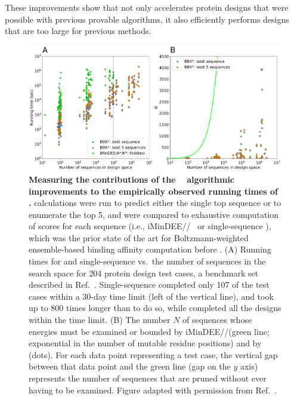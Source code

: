 These improvements show that \bbks not only accelerates protein designs that were possible with previous provable algorithms, it also efficiently performs designs that are too large for previous methods.

\begin{figure}
\center
\includegraphics[width=6.5in]{figures/bbks.png}
\caption{\textbf{Measuring the contributions of the \bbks~\cite{BBK*} algorithmic improvements to the empirically observed running times of \osprey.}  \bbks calculations were run to predict either the single top sequence or to enumerate the top 5, and were compared to exhaustive computation of \ks scores for each sequence (i.e., iMinDEE/\as/\ks~\cite{minDEE,iMinDEE} or single-sequence \ks), which was the prior state of the art for Boltzmann-weighted ensemble-based binding affinity computation before \bbks.  (A) Running times for \bbks and single-sequence \ks vs.~the number of sequences in the search space for 204 protein design test cases, a benchmark set described in Ref.~.  Single-sequence \ks completed only 107 of the test cases within a 30-day time limit (left of the vertical line), and took up to 800 times longer than \bbks to do so, while \bbks completed all the designs within the time limit.  (B) The number $N$ of sequences whose energies must be examined or bounded by iMinDEE/\as/\ks (green line; exponential in the number of mutable residue positions) and by \bbks (dots). For each data point representing a \bbks test case, the vertical gap between that data point and the green line (gap on the $y$ axis) represents the number of sequences that are pruned without ever having to be examined.  Figure adapted with permission from Ref.~.  }
\label{fig:bbks}
\end{figure}
